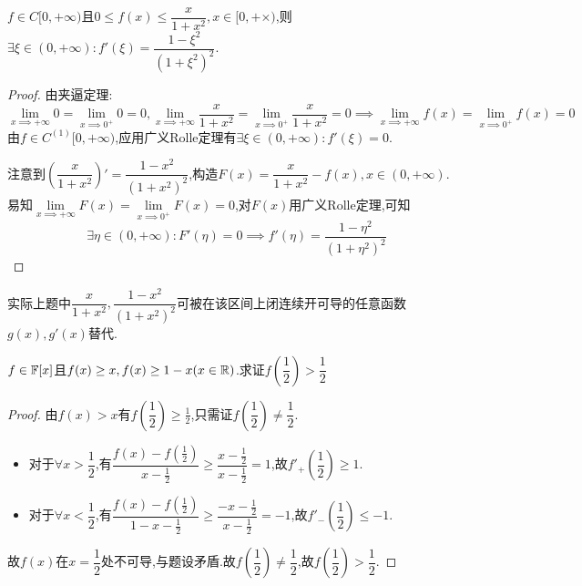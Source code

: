 \documentclass[UTF8]{book}
\begin{document}
    \begin{example}
        $f\in C[0,+\infty)$且$0\leq f(x)\leq \dfrac{x}{1+x^2},x\in[0,+\times)$,则$\exists \xi\in (0,+\infty):f'(\xi)=\dfrac{1-\xi^2}{(1+\xi^2)^2}$.
        \begin{proof}
            由夹逼定理:\[\lim_{x\implies +\infty}0=\lim_{x\implies 0^+}0=0, \lim_{x\implies +\infty}\frac{x}{1+x^2}=\lim_{x\implies 0^+}\frac{x}{1+x^2}=0\implies \lim_{x\implies +\infty}f(x)=\lim_{x\implies 0^+}f(x)=0\]
            由$f\in C^{(1)}[0,+\infty)$,应用广义Rolle定理有$\exists \xi\in(0,+\infty):f'(\xi)=0.$

            注意到$\left( \dfrac{x}{1+x^2} \right)'\!=\!\dfrac{1-x^2}{(1+x^2)^2}$,构造$F(x)\!=\!\dfrac{x}{1+x^2}-f(x),x\in(0,+\infty)$.\\ 易知$\lim\limits_{x\implies +\infty}F(x)\!=\!\lim\limits_{x\implies 0^+}F(x)\!=\!0$,对$F(x)$用广义Rolle定理,可知
            \[\exists \eta\in(0,+\infty):F'(\eta)=0\implies f'(\eta)=\frac{1-\eta^2}{(1+\eta^2)^2}\]
        \end{proof}
        实际上题中$\dfrac{x}{1+x^2},\dfrac{1-x^2}{(1+x^2)^2}$可被在该区间上闭连续开可导的任意函数$g(x),g'(x)$替代.
    \end{example}\begin{example}
        $f\in \mathbb{F}[x]$且$f(x)\geq x, f(x)\geq 1-x (x\in\mathbb{R})$.求证$f\left(\dfrac{1}{2}\right)>\dfrac{1}{2}$
        \begin{proof}
            由$f(x)>x$有$f\left( \dfrac{1}{2} \right)\geq \frac{1}{2}$,只需证$f\left( \dfrac{1}{2} \right)\neq \dfrac{1}{2}$.

            \begin{itemize}
                \item 对于$\forall x>\dfrac{1}{2}$,有$\dfrac{f(x)-f(\frac{1}{2})}{x-\frac{1}{2}}\geq \dfrac{x-\frac{1}{2}}{x-\frac{1}{2}}=1$,故$f'_+\left( \dfrac{1}{2} \right)\geq 1$.
                \item 对于$\forall x<\dfrac{1}{2}$,有$\dfrac{f(x)-f(\frac{1}{2})}{1-x-\frac{1}{2}}\geq \dfrac{-x-\frac{1}{2}}{x-\frac{1}{2}}=-1$,故$f'_-\left( \dfrac{1}{2} \right)\leq -1$.
            \end{itemize}
            故$f(x)$在$x=\dfrac{1}{2}$处不可导,与题设矛盾.故$f\left( \dfrac{1}{2} \right)\neq \dfrac{1}{2}$,故$f\left(\dfrac{1}{2}\right)>\dfrac{1}{2}$.
        \end{proof}
    \end{example}
\end{document}
